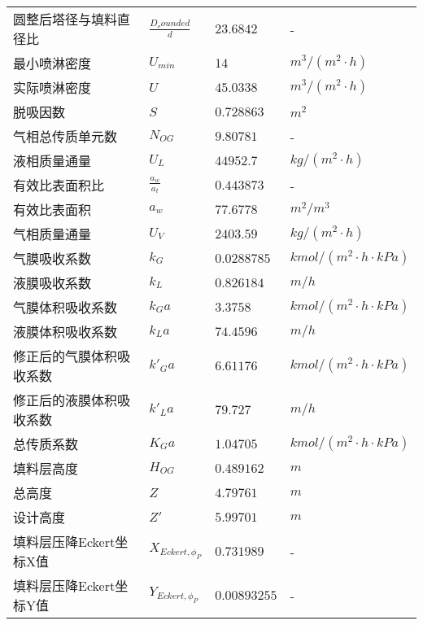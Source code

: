 \begin{longtable}{
		@{} p{} p{} 
		p{} p{} @{}
		}
	圆整后塔径与填料直径比 & $\frac{D_rounded}{d}$ & $23.6842$ & - \\
	最小喷淋密度 & $U_{min}$ & $14$ & $m^{3}/(m^{2}·h)$ \\
	实际喷淋密度 & $U$ & $45.0338$ & $m^{3}/(m^{2}·h)$ \\
	脱吸因数 & $S$ & $0.728863$ & $m^{2}$ \\
	气相总传质单元数 & $N_{OG}$ & $9.80781$ & - \\
	液相质量通量 & $U_L$ & $44952.7$ & $kg/(m^{2}·h)$ \\
	有效比表面积比 & $\frac{a_w}{a_t}$ & $0.443873$ & - \\
	有效比表面积 & $a_w$ & $77.6778$ & $m^{2}/m^{3}$ \\
	气相质量通量 & $U_V$ & $2403.59$ & $kg/(m^{2}·h)$ \\
	气膜吸收系数 & $k_G$ & $0.0288785$ & $kmol/(m^{2}·h·kPa)$ \\
	液膜吸收系数 & $k_L$ & $0.826184$ & $m/h$ \\
	气膜体积吸收系数 & $k_{G}a$ & $3.3758$ & $kmol/(m^{2}·h·kPa)$ \\
	液膜体积吸收系数 & $k_{L}a$ & $74.4596$ & $m/h$ \\
	修正后的气膜体积吸收系数 & $k'_{G}a$ & $6.61176$ & $kmol/(m^{2}·h·kPa)$ \\
	修正后的液膜体积吸收系数 & $k'_{L}a$ & $79.727$ & $m/h$ \\
	总传质系数 & $K_{G}a$ & $1.04705$ & $kmol/(m^{2}·h·kPa)$ \\
	填料层高度 & $H_{OG}$ & $0.489162$ & $m$ \\
	总高度 & $Z$ & $4.79761$ & $m$ \\
	设计高度 & $Z'$ & $5.99701$ & $m$ \\
	填料层压降Eckert坐标X值 & $X_{Eckert, \phi_P}$ & $0.731989$ & - \\
	填料层压降Eckert坐标Y值 & $Y_{Eckert, \phi_P}$ & $0.00893255$ & - 
\end{longtable}